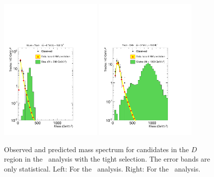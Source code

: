 \begin{figure}
 \begin{center}
  \includegraphics[clip=true, trim=0.0cm 0cm 2.8cm 0cm,width=0.44\textwidth]{figures/tkmu/RescaleNoRatio_Mass_8TeV_TightNoSMMC}
  \includegraphics[clip=true, trim=0.0cm 0cm 2.8cm 0cm,width=0.44\textwidth]{figures/tkonly/RescaleNoRatio_Mass_8TeV_TightNoSMMC}
 \end{center}
 \caption[Observed and predicted mass spectrum for candidates in the signal region with the final selection thresholds in the \tktof\ and \tkonly\ analyses.]
{Observed and predicted mass spectrum for candidates in the $D$ region in the \tktof\ analysis with the tight selection.
The error bands are only statistical. Left: For the \tktof\ analysis. Right: For the \tkonly\ analysis.}
\label{fig:TightMassDistribution}
\end{figure}